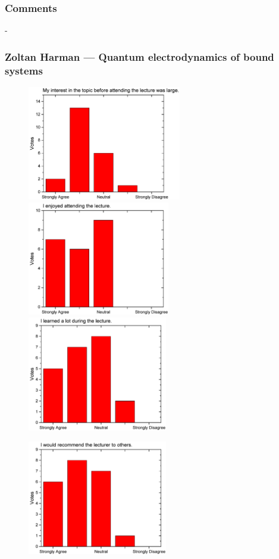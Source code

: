 \subsubsection*{Comments}
-
\newpage

\subsubsection{Zoltan Harman  --- Quantum electrodynamics of bound systems}
\begin{figure}[h!]
  \centering
  \begin{minipage}{.48\linewidth}
    \centering
      {\includegraphics[height=50mm]{figures/n/Graph41.pdf}}
      {\includegraphics[height=50mm]{figures/n/Graph42.pdf}}
      {\includegraphics[height=50mm]{figures/n/Graph43.pdf}}
  \end{minipage}\quad
  \begin{minipage}{.48\linewidth}
    \centering
      {\includegraphics[height=50mm]{figures/n/Graph44.pdf}}

\end{minipage}
\end{figure}
